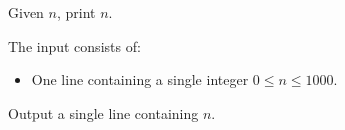 \problemname{\problemyamlname}

\newcommand{\maxn}{1000}

Given $n$, print $n$.

\begin{Input}
	The input consists of:
	\begin{itemize}
		\item One line containing a single integer $0\leq n\leq \maxn$.
	\end{itemize}
\end{Input}

\begin{Output}
	Output a single line containing $n$.
\end{Output}
